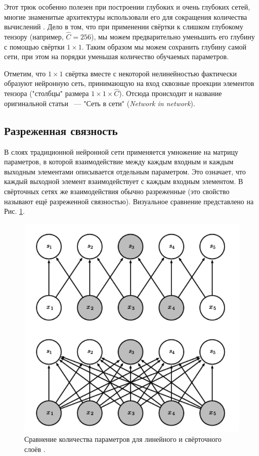\documentclass[12pt, fleqn]{article}
\begin{document}
    Этот трюк особенно полезен при построении глубоких и очень глубоких сетей, многие 
    знаменитые архитектуры использовали его для сокращения количества вычислений 
    \cite{he2016deep, szegedy2015going, iandola2016squeezenet}. Дело в том, что 
    при применении свёртки к слишком глубокому тензору (например, $\hat{C} = 256$), 
    мы можем предварительно уменьшить его глубину с помощью свёртки $1 \times 1$. 
    Таким образом мы можем сохранить глубину самой сети, при этом на порядки уменьшая количество 
    обучаемых параметров.

    Отметим, что $1 \times 1$ свёртка вместе с некоторой нелинейностью фактически образуют 
    нейронную сеть, принимающую на вход сквозные проекции элементов тензора ("столбцы" размера 
    $1 \times 1 \times \hat{C}$). Отсюда происходит и название оригинальной статьи \cite{lin2013network}~--- 
    "Сеть в сети" (\textit{Network in network}).
        
    \subsection{Разреженная связность}

    В слоях традиционной нейронной сети применяется умножение на матрицу параметров, 
    в которой взаимодействие между каждым входным и каждым выходным элементами описывается отдельным параметром. 
    Это означает, что каждый выходной элемент взаимодействует с каждым входным элементом. В свёрточных сетях же взаимодействия обычно 
    разреженные (это свойство называют ещё разреженной связностью). Визуальное сравнение представлено на Рис. \ref{sparse_interactions}.

    \begin{figure}[ht]
        \centering
        \includegraphics[scale=0.5]{pics/sparse_interactions.png}
        \caption{Сравнение количества параметров для линейного и свёрточного слоёв \cite{Goodfellow-et-al-2016}.}
        \label{sparse_interactions}
    \end{figure}
    
\end{document}

